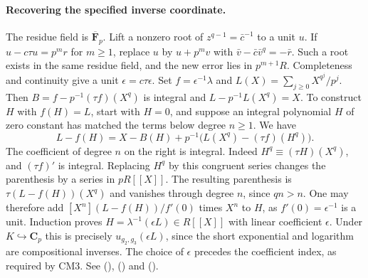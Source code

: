 \paragraph{Recovering the specified inverse coordinate.}
The residue field is $\overline{\mathbf F}_p$. Lift a nonzero root
of $z^{q-1}=\bar c^{-1}$ to a unit $u$. If $u-c\tau u=p^m r$
for $m\ge1$, replace $u$ by $u+p^m v$ with
$\bar v-\bar c\bar v^q=-\bar r$. Such a root exists in the same
residue field, and the new error lies in $p^{m+1}R$. Completeness
and continuity give a unit $\epsilon=c\tau\epsilon$.
Set $f=\epsilon^{-1}\lambda$ and
$L(X)=\sum_{j\ge0}X^{q^j}/p^j$. Then
$B=f-p^{-1}(\tau f)(X^q)$ is integral and $L-p^{-1}L(X^q)=X$.
To construct $H$ with $f(H)=L$, start with $H=0$, and suppose
an integral polynomial $H$ of zero constant has matched the terms
below degree $n\ge1$. We have
\[
 L-f(H)=X-B(H)+p^{-1}\big(L(X^q)-(\tau f)(H^q)\big).
\]
The coefficient of degree $n$ on the right is integral. Indeed
$H^q\equiv(\tau H)(X^q)$, and $(\tau f)'$ is integral. Replacing
$H^q$ by this congruent series changes the parenthesis by a series
in $pR[[X]]$. The resulting parenthesis is
$\tau(L-f(H))(X^q)$ and vanishes through degree $n$, since $qn>n$.
One may therefore add $[X^n](L-f(H))/f'(0)$ times $X^n$ to $H$,
as $f'(0)=\epsilon^{-1}$ is a unit. Induction proves
$H=\lambda^{-1}(\epsilon L)\in R[[X]]$ with linear coefficient
$\epsilon$. Under $K\hookrightarrow\mathbf C_p$ this is precisely
$u_{g_2,g_3}(\epsilon L)$, since the short exponential and logarithm
are compositional inverses. The choice of $\epsilon$ precedes the
coefficient index, as required by CM3. See
 (),
 () and
 ().

